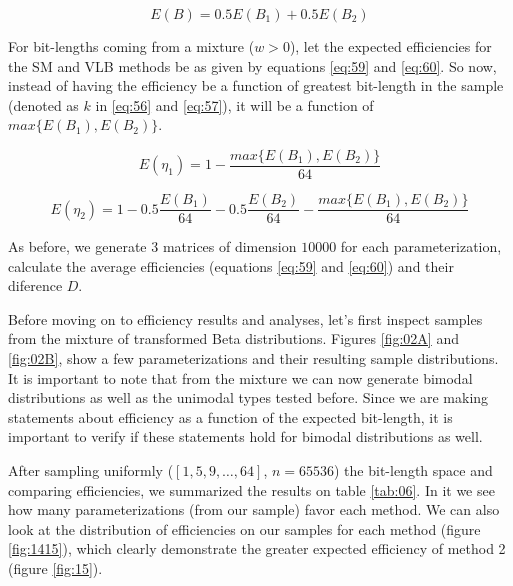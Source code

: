 \documentclass[10pt]{article}
\begin{document}
\begin{equation}\label{eq:58}
 E(B) = 0.5 E(B_1) + 0.5 E(B_2)
\end{equation}
 
For bit-lengths coming from a mixture ($w>0$), let the expected efficiencies for the SM and VLB methods be as given by equations \ref{eq:59} and \ref{eq:60}. So now, instead of having the efficiency be a function of greatest bit-length in the sample (denoted as  $k$ in \ref{eq:56} and \ref{eq:57}), it will be a function of $max\{E(B_1),E(B_2)\}$.

\begin{equation}\label{eq:59}
 E(\eta_1) = 1 - \frac{max\{E(B_1),E(B_2)\}}{64}
\end{equation}

\begin{equation}\label{eq:60}
 E(\eta_2) = 1 - 0.5\frac{E(B_1)}{64} - 0.5\frac{E(B_2)}{64} - \frac{max\{E(B_1),E(B_2)\}}{64}
\end{equation}
 
As before, we generate 3 matrices of dimension $10000$ for each parameterization, calculate the average efficiencies (equations \ref{eq:59} and \ref{eq:60}) and their diference $D$.

Before moving on to efficiency results and analyses, let's first inspect samples from the mixture of transformed Beta distributions. Figures \ref{fig:02A} and \ref{fig:02B}, show a few parameterizations and their resulting sample distributions. It is important to note that from the mixture we can now generate bimodal distributions as well as the unimodal types tested before. Since we are making statements about efficiency as a function of the expected bit-length, it is important to verify if these statements hold for bimodal  distributions as well.

After sampling uniformly ($[1,5,9,\ldots,64]$, $n=65536$) the bit-length space and comparing efficiencies, we summarized the results on table \ref{tab:06}. In it we see how many parameterizations (from our sample) favor each method. We can also look at the distribution of efficiencies on our samples for each method (figure \ref{fig:1415}), which clearly demonstrate the greater expected efficiency of method 2 (figure \ref{fig:15}).
\end{document}

